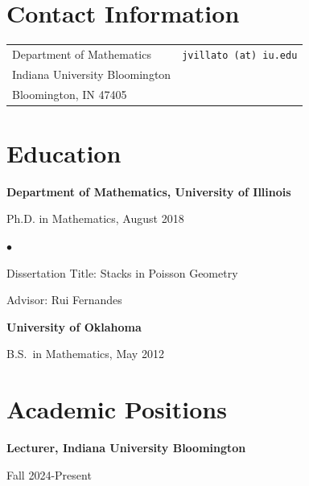 \documentclass[margin,line,pifont,palatino,courier]{res}
\newenvironment{list1}{
  \begin{list}{\ding{113}}{%
      \setlength{\itemsep}{0in}
      \setlength{\parsep}{0in} \setlength{\parskip}{0in}
      \setlength{\topsep}{0in} \setlength{\partopsep}{0in}
      \setlength{\leftmargin}{0.17in}}}{\end{list}}
\newenvironment{list2}{
  \begin{list}{$\bullet$}{%
      \setlength{\itemsep}{0in}
      \setlength{\parsep}{0in} \setlength{\parskip}{0in}
      \setlength{\topsep}{0in} \setlength{\partopsep}{0in}
      \setlength{\leftmargin}{0.2in}}}{\end{list}}
\begin{document}

\begin{resume}

\section{\sc Contact Information}

\vspace{.05in}
\begin{tabular}{@{}p{2.75in}p{2in}}
Department of Mathematics                        & \verb+jvillato (at) iu.edu+\\
Indiana University Bloomington                &  \\
Bloomington, IN 47405                   & \\
\end{tabular}


\section{\sc Education}

{\bf Department of Mathematics, University of Illinois}\\
\vspace*{-.1in}
\begin{list1}
\item[] Ph.D. in Mathematics, August 2018

\begin{list2}
\vspace*{.05in}
\item Dissertation Title: Stacks in Poisson Geometry
\item Advisor: Rui Fernandes
\end{list2}
\end{list1}

{\bf University of Oklahoma}\\
\vspace*{-.1in}
\begin{list1}
\item[] B.S.~in Mathematics, May 2012

\end{list1}

\section{\sc Academic Positions}
{\bf Lecturer, Indiana University Bloomington}\\
\vspace*{-.1in}
\begin{list1}
\item[] Fall 2024-Present
\end{list1}


\end{resume}
\end{document}
